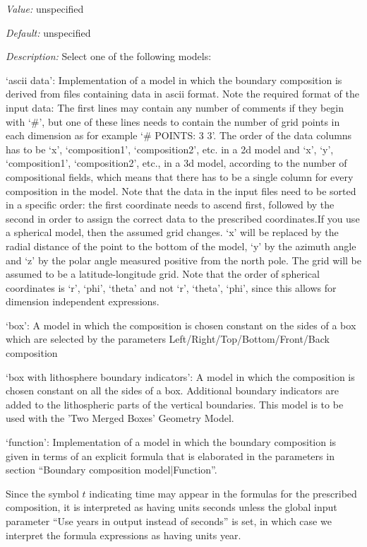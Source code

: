 \begin{itemize}
{\it Value:} unspecified


{\it Default:} unspecified


{\it Description:} Select one of the following models:

`ascii data': Implementation of a model in which the boundary composition is derived from files containing data in ascii format. Note the required format of the input data: The first lines may contain any number of comments if they begin with `#', but one of these lines needs to contain the number of grid points in each dimension as for example `# POINTS: 3 3'. The order of the data columns has to be `x', `composition1', `composition2', etc. in a 2d model and `x', `y', `composition1', `composition2', etc., in a 3d model, according to the number of compositional fields, which means that there has to be a single column for every composition in the model. Note that the data in the input files need to be sorted in a specific order: the first coordinate needs to ascend first, followed by the second in order to assign the correct data to the prescribed coordinates.If you use a spherical model, then the assumed grid changes. `x' will be replaced by the radial distance of the point to the bottom of the model, `y' by the azimuth angle and `z' by the polar angle measured positive from the north pole. The grid will be assumed to be a latitude-longitude grid. Note that the order of spherical coordinates is `r', `phi', `theta' and not `r', `theta', `phi', since this allows for dimension independent expressions.

`box': A model in which the composition is chosen constant on the sides of a box which are selected by the parameters Left/Right/Top/Bottom/Front/Back composition

`box with lithosphere boundary indicators': A model in which the composition is chosen constant on all the sides of a box. Additional boundary indicators are added to the lithospheric parts of the vertical boundaries. This model is to be used with the 'Two Merged Boxes' Geometry Model.

`function': Implementation of a model in which the boundary composition is given in terms of an explicit formula that is elaborated in the parameters in section ``Boundary composition model|Function''. 

Since the symbol $t$ indicating time may appear in the formulas for the prescribed composition, it is interpreted as having units seconds unless the global input parameter ``Use years in output instead of seconds'' is set, in which case we interpret the formula expressions as having units year.


\end{itemize}
